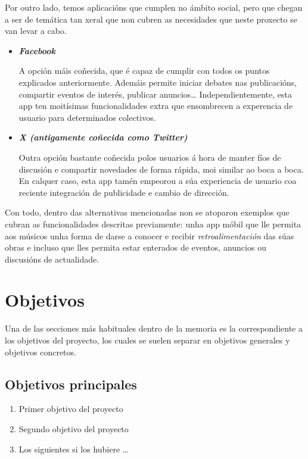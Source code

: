 Por outro lado, temos aplicacións que cumplen no ámbito social, pero que chegan a ser de temática tan xeral que non cubren as necesidades que neste proxecto se van levar a cabo.

\begin{itemize}
	\item \textbf{\textit{Facebook}} 
	
	A opción máis coñecida, que é capaz de cumplir con todos os puntos explicados anteriormente. Ademáis permite iniciar  debates nas publicacións, compartir eventos de interés, publicar anuncios\dots 
	Independientemente, esta app ten moitísimas funcionalidades extra que ensombrecen a experencia de usuario para determinados colectivos.
	
	\item \textbf{\textit{X (antigamente coñecida como Twitter)}} 
	
	Outra opción bastante coñecida  polos usuarios á hora de manter fíos de discusión e compartir novedades de forma rápida, moi similar ao boca a boca. En calquer caso, esta app tamén empeorou a súa experiencia de usuario coa reciente integración de publicidade e cambio de dirección.
	
\end{itemize}

Con todo, dentro das alternativas mencionadas non se atoparon exemplos que cubran as funcionalidades descritas previamente: unha app móbil que lle permita aos músicos unha forma de darse a conocer e recibir \textit{retroalimentación} das súas obras e incluso que lles permita estar enterados de eventos, anuncios ou discusións de actualidade.

\section{Objetivos}
\label{sec:objetivos}
Una de las secciones más habituales dentro de la memoria es la correspondiente a los objetivos del proyecto, los cuales se suelen separar en objetivos generales y objetivos concretos.  

\subsection{Objetivos principales}

\begin{enumerate}[label={\textbf{Objetivo \arabic*:}},leftmargin=2.5cm,labelindent=\parindent]
    \item Primer objetivo del proyecto
    \item Segundo objetivo del proyecto
    \item Los siguientes si los hubiere \ldots
\end{enumerate}

